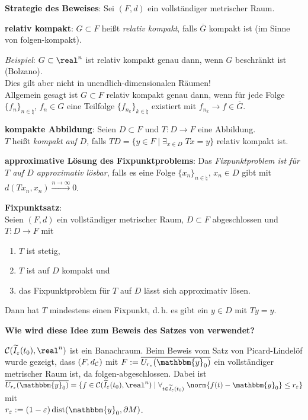 \linie

\textbf{Strategie des Beweises}:
Sei $(F, d)$ ein vollständiger metrischer Raum.

\textbf{relativ kompakt}:
$G \subset F$ heißt \emph{relativ kompakt}, falls $\overline{G}$ kompakt ist
(im Sinne von folgen-kompakt).

\emph{Beispiel}:
$G \subset \real^n$ ist relativ kompakt genau dann, wenn $G$ beschränkt ist
(Bolzano). \\
Dies gilt aber nicht in unendlich-dimensionalen Räumen! \\
Allgemein gesagt ist $G \subset F$ relativ kompakt genau dann, wenn für jede
Folge $\{f_n\}_{n \in \natural}$, $f_n \in G$ eine Teilfolge
$\{f_{n_k}\}_{k \in \natural}$ existiert mit $f_{n_k} \to f \in \overline{G}$.

\textbf{kompakte Abbildung}:
Seien $D \subset F$ und $T\colon D \rightarrow F$ eine Abbildung. \\
$T$ heißt \emph{kompakt auf $D$}, falls
$TD = \{y \in F \;|\; \exists_{x \in D}\; Tx = y\}$ relativ kompakt ist.

\textbf{approximative Lösung des Fixpunktproblems}:
Das \emph{Fixpunktproblem ist für $T$ auf $D$ approximativ lösbar},
falls es eine Folge $\{x_n\}_{n \in \natural}$, $x_n \in D$ gibt mit
$d(Tx_n, x_n) \xrightarrow{n \to \infty} 0$.

\textbf{Fixpunktsatz}: \\
Seien $(F, d)$ ein vollständiger metrischer Raum,
$D \subset F$ abgeschlossen und $T\colon D \rightarrow F$ mit
\begin{enumerate}
    \item
    $T$ ist stetig,

    \item
    $T$ ist auf $D$ kompakt und

    \item
    das Fixpunktproblem für $T$ auf $D$ lässt sich approximativ lösen.
\end{enumerate}
Dann hat $T$ mindestens einen Fixpunkt, d.\,h. es gibt ein $y \in D$ mit
$Ty = y$.

\linie
\pagebreak

\textbf{Wie wird diese Idee zum Beweis
des Satzes von  verwendet?}

$\C(\widetilde{I}_\varepsilon(t_0), \real^n)$ ist ein Banachraum.
Beim Beweis vom Satz von Picard-Lindelöf wurde gezeigt, dass $(F, d_{\mathcal{C}})$ mit
$F := \overline{U_{r_\varepsilon}(\mathbbm{y}_0)}$ ein vollständiger
metrischer Raum ist, da folgen-abgeschlossen.
Dabei ist $\overline{U_{r_\varepsilon}(\mathbbm{y}_0)} =
\{f \in \C(\widetilde{I}_\varepsilon(t_0), \real^n) \;|\;
\forall_{t \in \widetilde{I}_\varepsilon(t_0)}\;
\norm{f(t) - \mathbbm{y}_0} \le r_\varepsilon\}$ mit \\
$r_\varepsilon := (1 - \varepsilon) \dist(\mathbbm{y}_0, \partial M)$.

